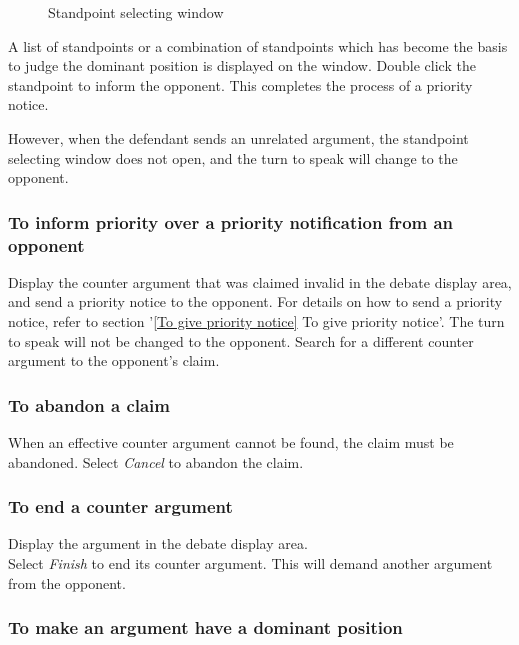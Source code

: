 \begin{figure}[htb]
\begin{center}
\end{center}
\caption{Standpoint selecting window}\label{Standpoint selecting window}
\end{figure}

A list of standpoints or a combination of standpoints which has become the basis to judge the dominant position is displayed on the window.
Double click the standpoint to inform the opponent.
This completes the process of a priority notice.

However, when the defendant sends an unrelated argument, the standpoint selecting window does not open, and the turn to speak will change to the opponent.

\subsubsection{To inform priority over a priority notification from an opponent}

Display the counter argument that was claimed invalid in the debate display area, and send a priority notice to the opponent.
For details on how to send a priority notice, refer to section '\ref{To give priority notice} To give priority notice'.
The turn to speak will not be changed to the opponent.  Search for a different counter argument to the opponent's claim.

\subsubsection{To abandon a claim}

When an effective counter argument cannot be found, the claim must be abandoned.
Select {\sl Cancel} to abandon the claim.

\subsubsection{To end a counter argument}

Display the argument in the debate display area.\\
Select {\sl Finish} to end its counter argument.  This will demand another argument from the opponent.

\subsubsection{To make an argument have a dominant position}\label{To make an argument have a dominant position}

